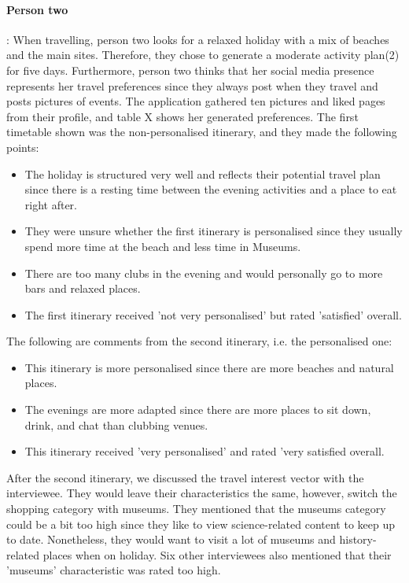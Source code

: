 \paragraph{Person two}:  When travelling, person two looks for a relaxed
holiday with a mix of beaches and the main sites. Therefore, they chose to
generate a moderate activity plan(2) for five days. Furthermore, person two
thinks that her social media presence represents her travel preferences since
they always post when they travel and posts pictures of events.  The
application gathered ten pictures and liked pages from their profile, and table
X shows her generated preferences.  The first timetable shown was the
non-personalised itinerary, and they made the following points:
\begin{itemize}
\item The holiday is structured very well and reflects their potential travel plan since there is a resting time between the evening activities and a place to eat right after.
\item They were unsure whether the first itinerary is personalised since they usually spend more time at the beach and less time in Museums.
\item There are too many clubs in the evening and would personally go to more bars and relaxed places.
\item The first itinerary received 'not very personalised' but rated 'satisfied' overall. 

\end{itemize}
The following are comments from the second itinerary, i.e. the personalised one:
\begin{itemize}
\item This itinerary is more personalised since there are more beaches and natural places.
\item The evenings are more adapted since there are more places to sit down, drink, and chat than clubbing venues.
\item This itinerary received  'very personalised' and rated 'very satisfied overall. 
\end{itemize}
After the second itinerary, we discussed the travel interest vector with the
interviewee. They would leave their characteristics the same, however, switch
the shopping category with museums. They mentioned that the museums category
could be a bit too high since they like to view science-related content to keep
up to date. Nonetheless, they would want to visit a lot of museums and
history-related places when on holiday. Six other interviewees also mentioned
that their 'museums' characteristic was rated too high. 

